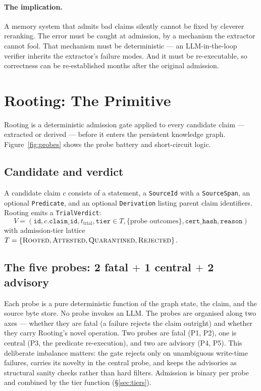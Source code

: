 \documentclass[10pt,a4paper]{article}
\begin{document}
\paragraph{The implication.}
A memory system that admits bad claims silently cannot be fixed by
cleverer reranking. The error must be caught at admission, by a mechanism
the extractor cannot fool. That mechanism must be deterministic --- an
LLM-in-the-loop verifier inherits the extractor's failure modes. And it must
be re-executable, so correctness can be re-established months after the
original admission.

\section{Rooting: The Primitive}
\label{sec:primitive}

Rooting is a deterministic admission gate applied to every candidate claim
--- extracted or derived --- before it enters the persistent knowledge
graph. Figure~\ref{fig:probes} shows the probe battery and short-circuit
logic.

\subsection{Candidate and verdict}

A candidate claim $c$ consists of a statement, a \texttt{SourceId} with a
\texttt{SourceSpan}, an optional \texttt{Predicate}, and an optional
\texttt{Derivation} listing parent claim identifiers. Rooting emits a
\texttt{TrialVerdict}:
\[
  V = (\texttt{id}, c.\texttt{claim\_id}, t_{\text{trial}},
        \texttt{tier} \in T, \{\text{probe outcomes}\},
        \texttt{cert\_hash}, \texttt{reason})
\]
with admission-tier lattice
$T = \{\textsc{Rooted}, \textsc{Attested}, \textsc{Quarantined}, \textsc{Rejected}\}$.

\subsection{The five probes: 2 fatal $+$ 1 central $+$ 2 advisory}
\label{sec:probes}

Each probe is a pure deterministic function of the graph state, the claim,
and the source byte store. No probe invokes an LLM. The probes are
organised along two axes --- whether they are fatal (a failure rejects the
claim outright) and whether they carry Rooting's novel operation. Two
probes are fatal (\textsc{P1}, \textsc{P2}), one is central
(\textsc{P3}, the predicate re-execution), and two are advisory
(\textsc{P4}, \textsc{P5}). This deliberate imbalance matters: the gate
rejects only on unambiguous write-time failures, carries its novelty in
the central probe, and keeps the advisories as structural sanity checks
rather than hard filters. Admission is binary per probe and combined by
the tier function (\S\ref{sec:tiers}).
\end{document}
